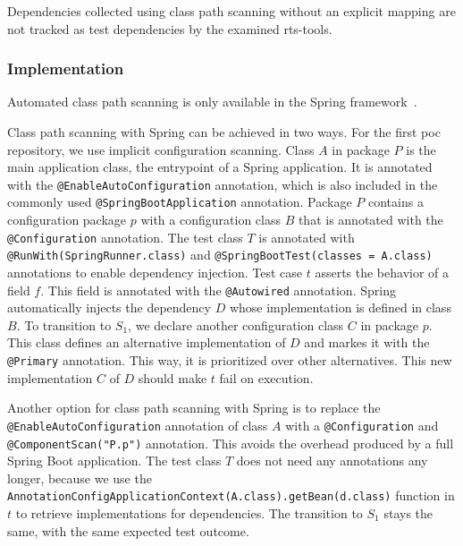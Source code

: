 \begin{hypothesis}\label{hyp:dep_inj:scan}
    Dependencies collected using class path scanning without an explicit mapping are not tracked as test
    dependencies by the examined \ac{rts}-tools.
\end{hypothesis}

\subsubsection{Implementation }\label{sssec:impl:class_path_scanning}
Automated class path scanning is only available in the Spring framework~\cite[1.10]{spring_manual}\cite{guice_jit_bindings}.

Class path scanning with Spring can be achieved in two ways. For the first \ac{poc} repository, we
use implicit configuration scanning. Class $A$ in package $P$ is the main application class, the entrypoint of a
Spring application. It is annotated with the \texttt{@EnableAutoConfiguration} annotation, which is
also included in the commonly used \texttt{@SpringBootApplication} annotation. Package $P$ contains a configuration
package $p$ with a configuration class $B$ that is annotated with the \texttt{@Configuration}
annotation. The test class $T$ is annotated with \texttt{@RunWith(SpringRunner.class)} and
\texttt{@SpringBootTest(classes = A.class)} annotations to enable dependency injection. Test case
$t$ asserts the behavior of a field $f$. This field is annotated with the \texttt{@Autowired}
annotation. Spring automatically injects the dependency $D$ whose implementation is defined in class $B$. To transition
to $S_1$, we declare another configuration class $C$ in package $p$. This class defines an alternative
implementation of $D$ and markes it with the \texttt{@Primary} annotation. This way, it is
prioritized over other alternatives. This new implementation $C$ of $D$ should make $t$ fail on
execution.

Another option for class path scanning with Spring is to replace the \texttt{@EnableAutoConfiguration}
annotation of class $A$ with a \texttt{@Configuration} and \texttt{@ComponentScan("P.p")}
annotation. This avoids the overhead produced by a full Spring Boot application. The test class $T$ does not
need any annotations any longer, because we use the \texttt{AnnotationConfigApplicationContext(A.class).getBean(d.class)}
function in $t$ to retrieve implementations for dependencies. The transition to $S_1$
stays the same, with the same expected test outcome.

